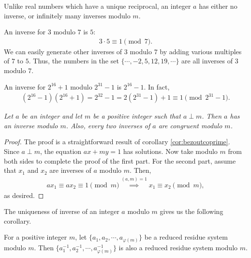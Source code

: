 \documentclass{subfile}
\begin{document}
	\begin{note}
		Unlike real numbers which have a unique reciprocal, an integer $a$ has either no inverse, or infinitely many inverses modulo $m$.
	\end{note}
	
	\begin{example}
		An inverse for $3$ modulo $7$ is $5$:
			\begin{align*}
				3 \cdot 5 \equiv 1 \pmod 7.
			\end{align*}
		We can easily generate other inverses of $3$ modulo $7$ by adding various multiples of $7$ to $5$. Thus, the numbers in the set $\{\cdots, -2, 5, 12, 19, \cdots \}$ are all inverses of $3$ modulo $7$.
	\end{example}
	
	\begin{example}
		An inverse for $2^{16}+1$ modulo $2^{31}-1$ is $2^{16}-1$. In fact,
			\begin{align*}
				(2^{16} - 1)(2^{16} + 1) = 2^{32} -1 = 2(2^{31} - 1) + 1 \equiv 1 \pmod{2^{31} - 1}.
			\end{align*}
	\end{example}
	
	
	\begin{theorem} \label{thm:arithinverse} \slshape
		Let $a$ be an integer and let $m$ be a positive integer such that $a \perp m$. Then $a$ has an inverse modulo $m$. Also, every two inverses of $a$ are congruent modulo $m$.
	\end{theorem}
	
	\begin{proof}
		The proof is a straightforward result of corollary \eqref{cor:bezoutcoprime}. Since $a \perp m$, the equation $ax+my=1$ has solutions. Now take modulo $m$ from both sides to complete the proof of the first part. For the second part, assume that $x_1$ and $x_2$ are inverses of $a$ modulo $m$. Then,
		\begin{align*}
		ax_1 \equiv ax_2 \equiv 1 \pmod m \stackrel{(a,m)=1}{\implies} x_1 \equiv x_2 \pmod m,
		\end{align*}
		as desired.
	\end{proof}
	
The uniqueness of inverse of an integer $a$ modulo $m$ gives us the following corollary.

	\begin{corollary}
		For a positive integer $m$, let $\{a_{1}, a_{2}, \cdots, a_{\varphi(m)}\}$ be a reduced residue system modulo $m$. Then $\{a_{1}^{-1}, a_{2}^{-1}, \cdots, a_{\varphi(m)}^{-1}\}$ is also a reduced residue system modulo $m$.
	\end{corollary}
	
\end{document}
